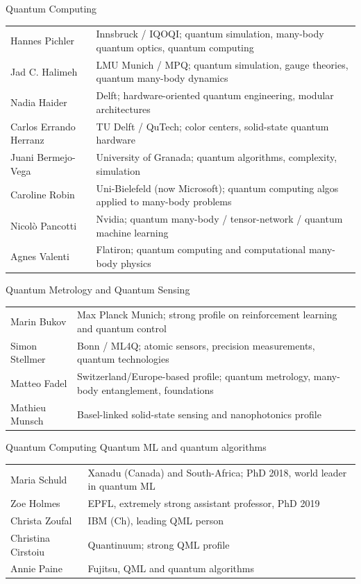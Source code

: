 \documentclass{beamer}
\begin{document}
\begin{frame}{Quantum Computing}
\small
\begin{tabular}{p{} p{}}
Hannes Pichler & Innsbruck / IQOQI; quantum simulation, many-body quantum optics, quantum computing \\[0.2cm]
Jad C. Halimeh & LMU Munich / MPQ; quantum simulation, gauge theories, quantum many-body dynamics \\[0.2cm]
Nadia Haider & Delft; hardware-oriented quantum engineering, modular architectures \\[0.2cm]
Carlos Errando Herranz & TU Delft / QuTech; color centers, solid-state quantum hardware \\[0.2cm]
Juani Bermejo-Vega & University of Granada; quantum algorithms, complexity, simulation \\[0.2cm]
Caroline Robin & Uni-Bielefeld (now Microsoft); quantum computing algos applied to many-body problems\\[0.2cm]
Nicolò Pancotti & Nvidia;  quantum many-body / tensor-network / quantum machine learning \\[0.2cm]
Agnes Valenti & Flatiron; quantum computing and computational many-body physics \\[02.cm]
\end{tabular}
\end{frame}

\begin{frame}{Quantum Metrology and Quantum Sensing}
\small
\begin{tabular}{p{} p{}}
Marin Bukov & Max Planck Munich; strong profile on reinforcement learning and quantum control\\[0.2cm]
Simon Stellmer & Bonn / ML4Q; atomic sensors, precision measurements, quantum technologies \\[0.2cm]
Matteo Fadel & Switzerland/Europe-based profile; quantum metrology, many-body entanglement, foundations \\[0.2cm]
Mathieu Munsch & Basel-linked solid-state sensing and nanophotonics profile \\[0.2cm]
\end{tabular}
\end{frame}


\begin{frame}{Quantum Computing Quantum ML and quantum algorithms}
\small
\begin{tabular}{p{} p{}}
Maria Schuld & Xanadu (Canada) and South-Africa; PhD 2018, world leader in quantum ML \\[0.2cm]
Zoe Holmes& EPFL, extremely strong assistant professor, PhD 2019 \\[0.2cm]
Christa Zoufal & IBM (Ch), leading QML person \\[0.2cm]
Christina Cirstoiu & Quantinuum; strong QML profile  \\[0.2cm]
Annie Paine & Fujitsu, QML and quantum algorithms  \\[0.2cm]
\end{tabular}
\end{frame}
\end{document}

